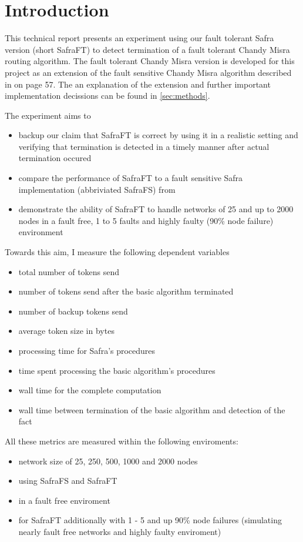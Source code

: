 \section{Introduction} 
This technical report presents an experiment using our fault tolerant Safra version (short SafraFT) \cite{ourpaper}
  to detect termination of a fault tolerant Chandy Misra routing algorithm.
 The fault tolerant Chandy Misra version is developed for this project as an extension of the fault sensitive Chandy Misra algorithm described in \cite{Fokkink:2018} on page 57.
 The an explanation of the extension and further important implementation decissions can be found in \cref{sec:methods}.
 
The experiment aims to
\begin{itemize}
	\item backup our claim that SafraFT is correct by using it in a realistic setting and verifying that termination is detected in a timely manner after actual termination occured
	\item compare the performance of SafraFT to a fault sensitive Safra implementation (abbriviated SafraFS) from \cite{demirbas2000optimal}
	\item demonstrate the ability of SafraFT to handle networks of 25 and up to 2000 nodes in a fault free, 1 to 5 faults and highly faulty (90\% node failure) environment
\end{itemize}

Towards this aim, I measure the following dependent variables
\begin{itemize}
	\item total number of tokens send
	\item number of tokens send after the basic algorithm terminated
	\item number of backup tokens send
	\item average token size in bytes
	\item processing time for Safra's procedures
	\item time spent processing the basic algorithm's procedures 
	\item wall time for the complete computation
	\item wall time  between termination of the basic algorithm and detection of the fact
\end{itemize} 

All these metrics are measured within the following enviroments:
\begin{itemize}
	\item network size of 25, 250, 500, 1000 and 2000 nodes
	\item using SafraFS and SafraFT
	\item in a fault free enviroment
	\item for SafraFT additionally with 1 - 5 and up 90\% node failures (simulating nearly fault free networks and highly faulty enviroment)
\end{itemize}

